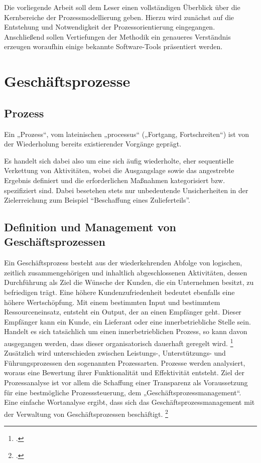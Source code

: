 Die vorliegende Arbeit soll dem Leser einen vollständigen Überblick über die
Kernbereiche der Prozessmodellierung geben. Hierzu wird zunächst auf die
Entstehung und Notwendigkeit der Prozessorientierung eingegangen. Anschließend
sollen Vertiefungen der Methodik ein genaueres Verständnis erzeugen woraufhin
einige bekannte Software-Tools präsentiert werden.

\clearpage
\section{Geschäftsprozesse}

\subsection{Prozess}


Ein „Prozess“, vom lateinischen „processus“ („Fortgang, Fortschreiten“) ist von
der Wiederholung bereits existierender Vorgänge geprägt.

Es handelt sich dabei also um eine sich äufig wiederholte, eher sequentielle
Verkettung von Aktivitäten, wobei die Ausgangslage sowie das
angestrebte Ergebnis definiert und die erforderlichen Maßnahmen
kategorisiert bzw. spezifiziert sind. Dabei besetehen stets nur
unbedeutende Unsicherheiten in der Zielerreichung zum Beispiel "`Beschaffung
eines Zulieferteils"'.

\subsection{Definition und Management von Geschäftsprozessen}


Ein Geschäftsprozess besteht aus der wiederkehrenden Abfolge von logischen,
zeitlich zusammengehörigen und inhaltlich abgeschlossenen Aktivitäten, dessen 
Durchführung als Ziel die Wünsche der Kunden, die ein Unternehmen besitzt, zu befriedigen trägt.
Eine höhere Kundenzufriedenheit bedeutet ebenfalls eine höhere Wertschöpfung. 
Mit einem bestimmten Input und bestimmtem Ressourceneinsatz, 
entsteht ein Output, der an einen Empfänger geht. 
Dieser Empfänger kann ein Kunde, ein Lieferant oder eine innerbetriebliche Stelle sein. 
Handelt es sich tatsächlich um einen innerbetrieblichen Prozess, 
so kann davon ausgegangen werden, dass dieser organisatorisch dauerhaft geregelt wird.
\footcite[Vgl.][ ]{prozess:db}\\



Zusätzlich wird unterschieden zwischen Leistungs-, Unterstützungs- und
Führungsprozessen den sogenannten Prozessarten. Prozesse werden analysiert, 
woraus eine Bewertung ihrer Funktionalität und Effektivität entsteht. 
Ziel der Prozessanalyse ist vor allem die Schaffung einer Transparenz als 
Voraussetzung für eine bestmögliche Prozesssteuerung, dem „Geschäftsprozessmanagement“. 
Eine einfache Wortanalyse ergibt, dass sich das Geschäftsprozessmanagement 
mit der Verwaltung von Geschäftsprozessen beschäftigt.
\footcite[S.13]{lehmann}\\


